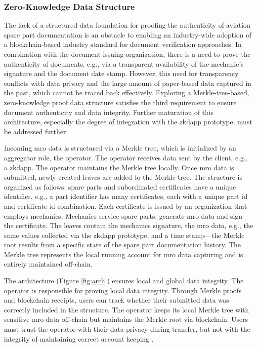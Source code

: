 \subsubsection{Zero-Knowledge Data Structure}
The lack of a structured data foundation for proofing the authenticity of aviation spare part documentation is an obstacle to enabling an industry-wide adoption of a blockchain-based industry standard for document verification approaches. In combination with the document issuing organization, there is a need to prove the authenticity of documents, e.g., via a transparent availability of the mechanic's signature and the document date stamp. However, this need for transparency conflicts with data privacy and the large amount of paper-based data captured in the past, which cannot be traced back effectively. Exploring a Merkle-tree-based, zero-knowledge proof data structure satisfies the third requirement to ensure document authenticity and data integrity. Further maturation of this architecture, especially the degree of integration with the \acrshort{zkdapp} prototype, must be addressed further.

Incoming \acrshort{mro} data is structured via a Merkle tree, which is initialized by an aggregator role, the operator. The operator receives data sent by the client, e.g., a \acrshort{zkdapp}. The operator maintains the Merkle tree locally. Once \acrshort{mro} data is submitted, newly created leaves are added to the Merkle tree. The structure is organized as follows: spare parts and subordinated certificates have a unique identifier, e.g., a part identifier has many certificates, each with a unique part id and certificate id combination. Each certificate is issued by an organization that employs mechanics. Mechanics service spare parts, generate \acrshort{mro} data and sign the certificate. The leaves contain the mechanics signature, the \acrshort{mro} data, e.g., the same values collected via the \acrshort{zkdapp} prototype, and a time stamp—the Merkle root results from a specific state of the spare part documentation history. The Merkle tree represents the local running account for \acrshort{mro} data capturing and is entirely maintained off-chain. 

The architecture (Figure \ref{fig:arch}) ensures local and global data integrity. The operator is responsible for proving local data integrity. Through Merkle proofs and blockchain receipts, users can track whether their submitted data was correctly included in the structure. The operator keeps its local Merkle tree with sensitive \acrshort{mro} data off-chain but maintains the Merkle root via blockchain. Users must trust the operator with their data privacy during transfer, but not with the integrity of maintaining correct account keeping \citep{sedlemeirgrenenergy}. 

